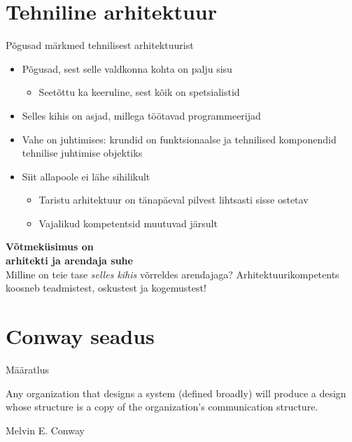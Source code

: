\documentclass{beamer}
\begin{document}
\section{Tehniline arhitektuur}
\begin{frame}{Põgusad märkmed tehnilisest arhitektuurist}

	\begin{itemize}
		\item Põgusad, sest selle valdkonna kohta on palju sisu
		\begin{itemize}
			\item Seetõttu ka keeruline, sest kõik on spetsialistid
		\end{itemize}
		\item Selles kihis on asjad, millega töötavad programmeerijad
		\item Vahe on juhtimises: krundid on funktsionaalse ja tehnilised komponendid tehnilise juhtimise objektiks
		\item Siit allapoole ei lähe sihilikult
		\begin{itemize}
			\item Taristu arhitektuur on tänapäeval pilvest lihtsasti sisse ostetav
			\item Vajalikud kompetentsid muutuvad järsult 
		\end{itemize}
	\end{itemize}
\end{frame}

\begin{frame}[fragile]
	\begin{center}
		\LARGE{\textbf{Võtmeküsimus on \\arhitekti ja arendaja suhe}}
		\\[4cm]
		\small{Milline on teie tase \emph{selles kihis} võrreldes arendajaga? Arhitektuurikompetents koosneb teadmistest, oskustest ja kogemustest!}
	\end{center}
\end{frame}


\section{Conway seadus}
\begin{frame}{Määratlus}
	\begin{displayquote}
		Any organization that designs a system (defined broadly) will produce a design whose structure is a copy of the organization's communication structure.
	\end{displayquote}
	Melvin E. Conway
\end{frame}
\end{document}
